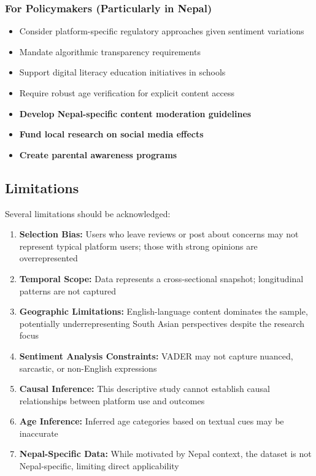 \documentclass[11pt,a4paper]{article}
\begin{document}
\subsubsection{For Policymakers (Particularly in Nepal)}

\begin{itemize}[leftmargin=*, itemsep=0.3em]
    \item Consider platform-specific regulatory approaches given sentiment variations
    \item Mandate algorithmic transparency requirements
    \item Support digital literacy education initiatives in schools
    \item Require robust age verification for explicit content access
    \item \textbf{Develop Nepal-specific content moderation guidelines}
    \item \textbf{Fund local research on social media effects}
    \item \textbf{Create parental awareness programs}
\end{itemize}

\subsection{Limitations}

Several limitations should be acknowledged:

\begin{enumerate}[leftmargin=*, itemsep=0.3em]
    \item \textbf{Selection Bias:} Users who leave reviews or post about concerns may not represent typical platform users; those with strong opinions are overrepresented
    \item \textbf{Temporal Scope:} Data represents a cross-sectional snapshot; longitudinal patterns are not captured
    \item \textbf{Geographic Limitations:} English-language content dominates the sample, potentially underrepresenting South Asian perspectives despite the research focus
    \item \textbf{Sentiment Analysis Constraints:} VADER may not capture nuanced, sarcastic, or non-English expressions
    \item \textbf{Causal Inference:} This descriptive study cannot establish causal relationships between platform use and outcomes
    \item \textbf{Age Inference:} Inferred age categories based on textual cues may be inaccurate
    \item \textbf{Nepal-Specific Data:} While motivated by Nepal context, the dataset is not Nepal-specific, limiting direct applicability
\end{enumerate}
\end{document}
